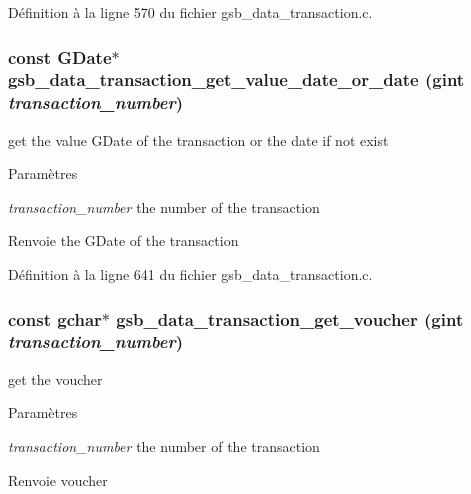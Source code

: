 Définition à la ligne 570 du fichier gsb\_\-data\_\-transaction.c.

\subsubsection[{gsb\_\-data\_\-transaction\_\-get\_\-value\_\-date\_\-or\_\-date}]{\setlength{\rightskip}{0pt plus 5cm}const GDate$\ast$ gsb\_\-data\_\-transaction\_\-get\_\-value\_\-date\_\-or\_\-date (gint {\em transaction\_\-number})}\label{gsb__data__transaction_8c_ab576cdbff4a0fdea4fbcbfed6d0a1669}
get the value GDate of the transaction or the date if not exist


\begin{DoxyParams}{Paramètres}
\item[{\em transaction\_\-number}]the number of the transaction\end{DoxyParams}
\begin{DoxyReturn}{Renvoie}
the GDate of the transaction 
\end{DoxyReturn}


Définition à la ligne 641 du fichier gsb\_\-data\_\-transaction.c.

\subsubsection[{gsb\_\-data\_\-transaction\_\-get\_\-voucher}]{\setlength{\rightskip}{0pt plus 5cm}const gchar$\ast$ gsb\_\-data\_\-transaction\_\-get\_\-voucher (gint {\em transaction\_\-number})}\label{gsb__data__transaction_8c_ad9886b09c3afc57a5c551896046a849a}
get the voucher 
\begin{DoxyParams}{Paramètres}
\item[{\em transaction\_\-number}]the number of the transaction \end{DoxyParams}
\begin{DoxyReturn}{Renvoie}
voucher 
\end{DoxyReturn}


